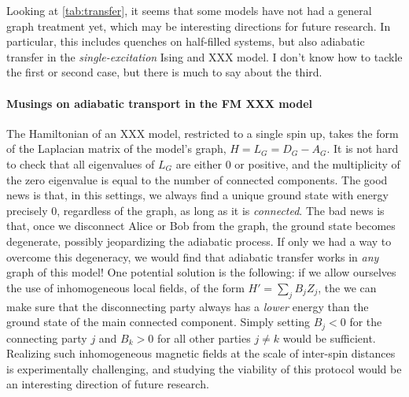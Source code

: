 Looking at \cref{tab:transfer}, it seems that some models have not had a general graph treatment yet, which may be interesting directions for future research. In particular, this includes quenches on half-filled systems, but also adiabatic transfer in the \emph{single-excitation} Ising and XXX model. I don't know how to tackle the first or second case, but there is much to say about the third.

\paragraph{Musings on adiabatic transport in the FM XXX model} The Hamiltonian of an XXX model, restricted to a single spin up, takes the form of the Laplacian matrix of the model's graph, $H = L_G = D_G - A_G$. It is not hard to check that all eigenvalues of $L_G$ are either $0$ or positive, and the multiplicity of the zero eigenvalue is equal to the number of connected components. The good news is that, in this settings, we always find a unique ground state with energy precisely $0$, regardless of the graph, as long as it is \emph{connected}. The bad news is that, once we disconnect Alice or Bob from the graph, the ground state becomes degenerate, possibly jeopardizing the adiabatic process. If only we had a way to overcome this degeneracy, we would find that adiabatic transfer works in \emph{any} graph of this model! One potential solution is the following: if we allow ourselves the use of inhomogeneous local fields, of the form $H' = \sum_{j} B_j Z_j$, the we can make sure that the disconnecting party always has a \emph{lower} energy than the ground state of the main connected component. Simply setting $B_j < 0$ for the connecting party $j$ and $B_{k} > 0$ for all other parties $j\neq k$ would be sufficient. Realizing such inhomogeneous magnetic fields at the scale of inter-spin distances is experimentally challenging, and studying the viability of this protocol would be an interesting direction of future research. 



















%

%
%
%
%
%
%
%
%
%
%
%
%
%



